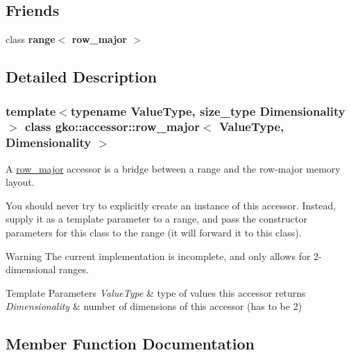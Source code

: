 \subsection*{Friends}
\begin{DoxyCompactItemize}
\item 
\mbox{\label{classgko_1_1accessor_1_1row__major_a770bcb0f86577602cd97f1ff8ccd7211}} 
class {\bfseries range$<$ row\+\_\+major $>$}
\end{DoxyCompactItemize}


\subsection{Detailed Description}
\subsubsection*{template$<$typename Value\+Type, size\+\_\+type Dimensionality$>$\newline
class gko\+::accessor\+::row\+\_\+major$<$ Value\+Type, Dimensionality $>$}

A \hyperlink{classgko_1_1accessor_1_1row__major}{row\+\_\+major} accessor is a bridge between a range and the row-\/major memory layout. 

You should never try to explicitly create an instance of this accessor. Instead, supply it as a template parameter to a range, and pass the constructor parameters for this class to the range (it will forward it to this class).

\begin{DoxyWarning}{Warning}
The current implementation is incomplete, and only allows for 2-\/dimensional ranges.
\end{DoxyWarning}

\begin{DoxyTemplParams}{Template Parameters}
{\em Value\+Type} & type of values this accessor returns \\
\hline
{\em Dimensionality} & number of dimensions of this accessor (has to be 2) \\
\hline
\end{DoxyTemplParams}


\subsection{Member Function Documentation}
\mbox{\label{classgko_1_1accessor_1_1row__major_a878a175c452549107d9db2521e481efe}} 
